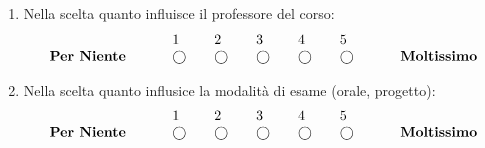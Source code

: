 \begin{enumerate}
    \item Nella scelta quanto influisce il professore del corso:
    \begin{equation*}
        \begin{array}{lllllll}
                        &  1 & 2 & 3 & 4 & 5 & \\
    \text { \textbf{Per Niente} } \quad \quad & \bigcirc \quad& \bigcirc \quad& \bigcirc \quad& \bigcirc \quad& \bigcirc \quad& \quad \text { \textbf{Moltissimo} }
        \end{array}
    \end{equation*}

    \item Nella scelta quanto influsice la modalità di esame (orale, progetto):
    \begin{equation*}
        \begin{array}{lllllll}
                        &  1 & 2 & 3 & 4 & 5 & \\
    \text { \textbf{Per Niente} } \quad \quad & \bigcirc \quad& \bigcirc \quad& \bigcirc \quad& \bigcirc \quad& \bigcirc \quad& \quad \text { \textbf{Moltissimo} }
        \end{array}
    \end{equation*}
\end{enumerate}

